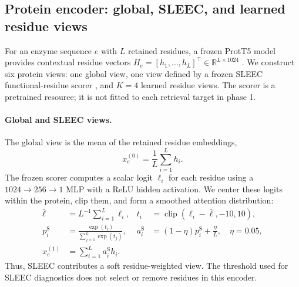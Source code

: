

\subsection{Protein encoder: global, SLEEC, and learned residue views}
\label{sec:v4-protein}
For an enzyme sequence $e$ with $L$ retained residues, a frozen ProtT5 model
provides contextual residue vectors
$H_e=[h_1,\ldots,h_L]^\top\in\mathbb{R}^{L\times1024}$
\citep{elnaggar2022prottrans}. We construct six protein views: one global
view, one view defined by a frozen SLEEC functional-residue scorer
\citep{gong2026sleec}, and $K=4$ learned residue views. The scorer is a
pretrained resource; it is not fitted to each retrieval target in phase 1.

\paragraph{Global and SLEEC views.}
The global view is the mean of the retained residue embeddings,
\begin{equation}
  x^{(0)}_e=\frac{1}{L}\sum_{i=1}^{L}h_i.
  \label{eq:v4-global}
\end{equation}
The frozen scorer computes a scalar logit $\ell_i$ for each residue using a
$1024\!\to\!256\!\to\!1$ MLP with a ReLU hidden activation. We center these
logits within the protein, clip them, and form a smoothed attention distribution:
\begin{align}
  \bar\ell &= L^{-1}\sum_{i=1}^{L}\ell_i,
  & t_i &= \operatorname{clip}(\ell_i-\bar\ell,-10,10),\\
  p_i^{\mathrm{S}} &= \frac{\exp(t_i)}{\sum_{j=1}^{L}\exp(t_j)},
  & a_i^{\mathrm{S}} &= (1-\eta)p_i^{\mathrm{S}}+\frac{\eta}{L},
  \quad \eta=0.05,\\
  x_e^{(1)} &= \sum_{i=1}^{L}a_i^{\mathrm{S}}h_i.
  \label{eq:v4-sleec}
\end{align}
Thus, SLEEC contributes a soft residue-weighted view. The threshold used for
SLEEC diagnostics does not select or remove residues in this encoder.


